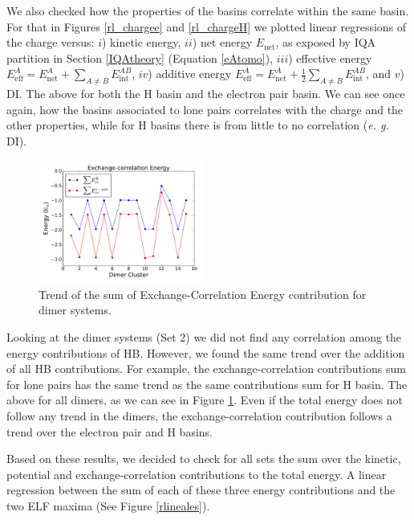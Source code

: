 \pagebreak

We also checked how the properties of the basins correlate within the same
basin. For that in Figures \ref{rl_chargee} and \ref{rl_chargeH} we plotted
linear regressions of the charge versus:
$i$) kinetic energy,%
$ii$) net energy $E_{\mathrm{net}}$, as exposed by IQA partition in Section \ref{IQAtheory} (Equation \ref{eAtomo}),
$iii$) effective energy $E_{\mathrm{eff}}^A=E_{\mathrm{net}}^A + \sum_{A\neq B}E_{\mathrm{int}}^{AB}$,
$iv$) additive energy $E_{\mathrm{eff}}^A=E_{\mathrm{net}}^A + \frac12 \sum_{A\neq B}E_{\mathrm{int}}^{AB}$, %
and $v$) DI.
The above for both the H basin and the electron pair basin.  We can see once
again, how the basins associated to lone pairs correlates with the charge and
the other properties, while for H basins there is from little to no correlation
(\textit{e. g.} DI).

\begin{figure}
    \centering
    \includegraphics[width=0.48\textwidth]{4/plots/promelf/xc1_xc2.pdf}
    \caption{Trend of the sum of Exchange-Correlation Energy contribution
    for dimer systems.}
\label{xcHxcE}
\end{figure}


Looking at the dimer systems (Set 2) we did not find any correlation among the
energy contributions of HB. However, we found the same trend over the addition
of all HB contributions.  For example, the exchange-correlation contributions
sum for lone pairs has the same trend as the same contributions sum for H
basin. The above for all dimers, as we can see in Figure \ref{xcHxcE}.  Even if
the total energy does not follow any trend in the dimers, the
exchange-correlation contribution follows a trend over the electron pair and H
basins.

Based on these results, we decided to check for all sets the sum over the
kinetic, potential and exchange-correlation contributions to the total energy.
A linear regression between the sum of each of these three energy contributions
and the two ELF maxima (See Figure \ref{rlineales}).

